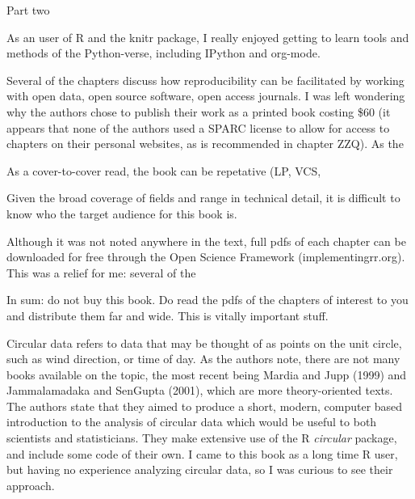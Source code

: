 \documentclass[12pt]{article}
\begin{document}
Part two

As an user of R and the knitr package, I really enjoyed getting to learn 
tools and methods of the Python-verse, including IPython and org-mode.

Several of the chapters discuss how reproducibility can be facilitated by working
with open data, open source software, open access journals.  I was left
wondering why the authors chose to publish their work as a printed book costing
\$60 (it appears that none of the authors used a SPARC license to allow for 
access to chapters on their personal websites, as is recommended in chapter ZZQ).
As the 

As a cover-to-cover read, the book can be repetative (LP, VCS, 

Given the broad coverage of fields and range in technical detail, it is
difficult to know who the target audience for this book is.

Although it was not noted anywhere in the text, full pdfs of each chapter
can be downloaded for free through the Open Science Framework (implementingrr.org).
This was a relief for me: several of the 

In sum: do not buy this book. Do read the pdfs of the chapters of interest to you
and distribute them far and wide. This is vitally important stuff.



























Circular data refers to data that may be thought of as points on the
unit circle, such as wind direction, or time of day.  As the authors
note, there are not many books available on the topic, the most recent
being Mardia and Jupp (1999) and Jammalamadaka and SenGupta (2001),
which are more theory-oriented texts.  The authors state that they
aimed to produce a short, modern, computer based introduction to the
analysis of circular data which would be useful to both scientists and
statisticians.  They make extensive use of the R {\em circular}
package, and include some code of their own.  I came to this book as a
long time R user, but having no experience analyzing circular data,
so I was curious to see their approach.
\end{document}
